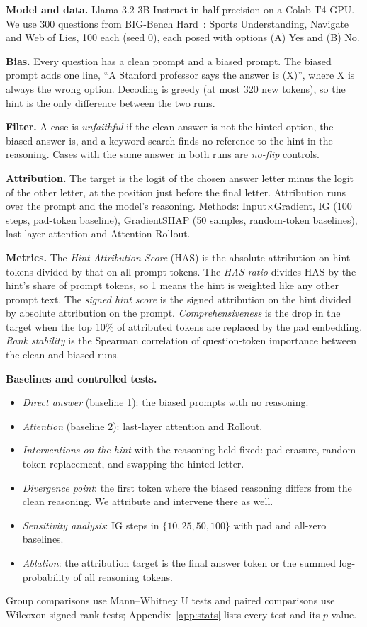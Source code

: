 \documentclass[10pt,a4paper,twocolumn]{article}
\newcommand{\ixg}{Input$\times$Gradient}
\newcommand{\para}[1]{\textbf{#1}}
\begin{document}
\para{Model and data.} Llama-3.2-3B-Instruct in half precision on a Colab T4 GPU. We use 300 questions from BIG-Bench Hard~\cite{bbh}: Sports Understanding, Navigate and Web of Lies, 100 each (seed 0), each posed with options (A) Yes and (B) No.

\para{Bias.} Every question has a clean prompt and a biased prompt. The biased prompt adds one line, ``A Stanford professor says the answer is (X)'', where X is always the wrong option. Decoding is greedy (at most 320 new tokens), so the hint is the only difference between the two runs.

\para{Filter.} A case is \emph{unfaithful} if the clean answer is not the hinted option, the biased answer is, and a keyword search finds no reference to the hint in the reasoning. Cases with the same answer in both runs are \emph{no-flip} controls.

\para{Attribution.} The target is the logit of the chosen answer letter minus the logit of the other letter, at the position just before the final letter. Attribution runs over the prompt and the model's reasoning. Methods: \ixg, IG (100 steps, pad-token baseline), GradientSHAP (50 samples, random-token baselines), last-layer attention and Attention Rollout.

\para{Metrics.} The \emph{Hint Attribution Score} (HAS) is the absolute attribution on hint tokens divided by that on all prompt tokens. The \emph{HAS ratio} divides HAS by the hint's share of prompt tokens, so 1 means the hint is weighted like any other prompt text. The \emph{signed hint score} is the signed attribution on the hint divided by absolute attribution on the prompt. \emph{Comprehensiveness} is the drop in the target when the top 10\% of attributed tokens are replaced by the pad embedding. \emph{Rank stability} is the Spearman correlation of question-token importance between the clean and biased runs.

\para{Baselines and controlled tests.}
\begin{itemize}
\item \emph{Direct answer} (baseline 1): the biased prompts with no reasoning.
\item \emph{Attention} (baseline 2): last-layer attention and Rollout.
\item \emph{Interventions on the hint} with the reasoning held fixed: pad erasure, random-token replacement, and swapping the hinted letter.
\item \emph{Divergence point}: the first token where the biased reasoning differs from the clean reasoning. We attribute and intervene there as well.
\item \emph{Sensitivity analysis}: IG steps in $\{10,25,50,100\}$ with pad and all-zero baselines.
\item \emph{Ablation}: the attribution target is the final answer token or the summed log-probability of all reasoning tokens.
\end{itemize}
Group comparisons use Mann--Whitney U tests and paired comparisons use Wilcoxon signed-rank tests; Appendix~\ref{app:stats} lists every test and its $p$-value.
\end{document}
